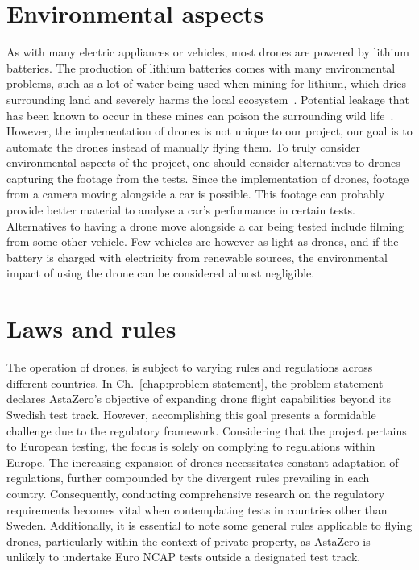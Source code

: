 \section{Environmental aspects}
As with many electric appliances or vehicles, most drones are powered by lithium batteries. The production of lithium batteries comes with many environmental problems, such as a lot of water being used when mining for lithium, which dries surrounding land and severely harms the local ecosystem~\cite{BauerSophie2020Explainer:Industry}. Potential leakage that has been known to occur in these mines can poison the surrounding wild life~\cite{AmitKatwala2018TheAddiction}. However, the implementation of drones is not unique to our project, our goal is to automate the drones instead of manually flying them. To truly consider environmental aspects of the project, one should consider alternatives to drones capturing the footage from the tests. Since the implementation of drones, footage from a camera moving alongside a car is possible. This footage can probably provide better material to analyse a car's performance in certain tests. Alternatives to having a drone move alongside a car being tested include filming from some other vehicle. Few vehicles are however as light as drones, and if the battery is charged with electricity from renewable sources, the environmental impact of using the drone can be considered almost negligible. 


\section{Laws and rules} \label{Laws and rules}
The operation of drones, is subject to varying rules and regulations across different countries. In Ch.~\ref{chap:problem statement}, the problem statement declares AstaZero's objective of expanding drone flight capabilities beyond its Swedish test track. However, accomplishing this goal presents a formidable challenge due to the regulatory framework. Considering that the project pertains to European testing, the focus is solely on complying to regulations within Europe. The increasing expansion  of drones necessitates constant adaptation of regulations, further compounded by the divergent rules prevailing in each country. Consequently, conducting comprehensive research on the regulatory requirements becomes vital when contemplating tests in countries other than Sweden. Additionally, it is essential to note some general rules applicable to flying drones, particularly within the context of private property, as AstaZero is unlikely to undertake Euro NCAP tests outside a designated test track.

